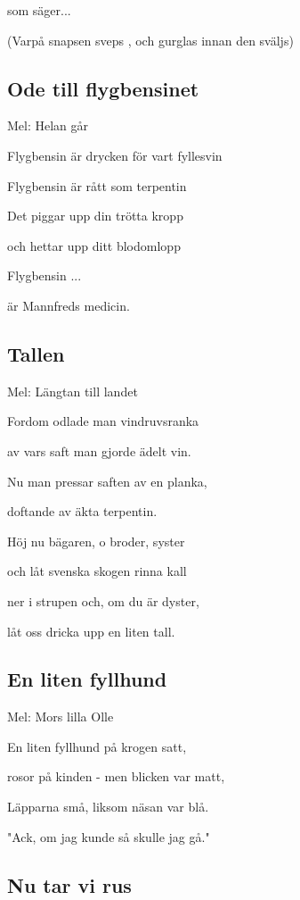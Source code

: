 som säger...

(Varpå snapsen sveps , och gurglas innan den sväljs)

\subsection{\textbf{Ode till flygbensinet}}

Mel: Helan går\bigskip

Flygbensin är drycken för vart fyllesvin

Flygbensin är rått som terpentin

Det piggar upp din trötta kropp

och hettar upp ditt blodomlopp

Flygbensin ...

är Mannfreds medicin.

\subsection{\textbf{Tallen}}

Mel: Längtan till landet\bigskip

Fordom odlade man vindruvsranka

av vars saft man gjorde ädelt vin.

Nu man pressar saften av en planka,

doftande av äkta terpentin.

Höj nu bägaren, o broder, syster

och låt svenska skogen rinna kall

ner i strupen och, om du är dyster,

låt oss dricka upp en liten tall.

\subsection{\textbf{En liten fyllhund}}

Mel: Mors lilla Olle\bigskip

En liten fyllhund på krogen satt,

rosor på kinden - men blicken var matt,

Läpparna små, liksom näsan var blå.

"Ack, om jag kunde så skulle jag gå."

\subsection{\textbf{Nu tar vi rus}}

